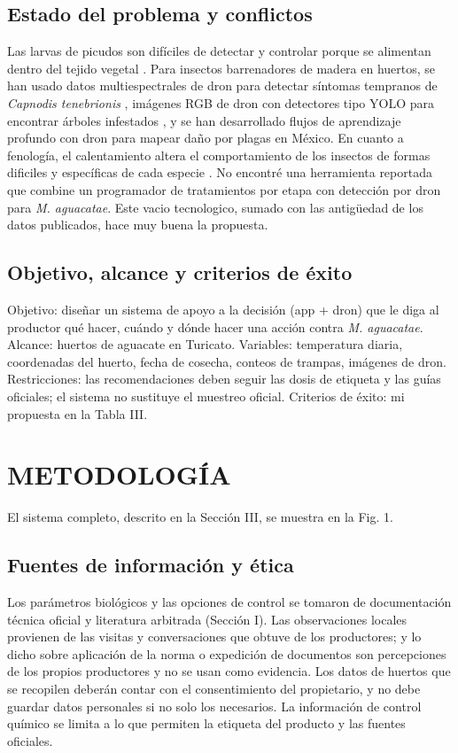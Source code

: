 \documentclass[conference]{IEEEtran}
\begin{document}
\subsection{Estado del problema y conflictos}
Las larvas de picudos son difíciles de detectar y controlar porque se alimentan dentro del tejido vegetal \cite{ref2}. Para insectos barrenadores de madera en huertos, se han usado datos multiespectrales de dron para detectar síntomas tempranos de \textit{Capnodis tenebrionis} \cite{ref15}, imágenes RGB de dron con detectores tipo YOLO para encontrar árboles infestados \cite{ref16}, y se han desarrollado flujos de aprendizaje profundo con dron para mapear daño por plagas en México\cite{ref17}. En cuanto a fenología, el calentamiento altera el comportamiento de los insectos de formas dificiles y específicas de cada especie \cite{ref18, ref19}. No encontré una herramienta reportada que combine un programador de tratamientos por etapa con detección por dron para \textit{M. aguacatae}. Este vacio tecnologico, sumado con las antigüedad de los datos publicados, hace muy buena la propuesta.

\subsection{Objetivo, alcance y criterios de éxito}
Objetivo: diseñar un sistema de apoyo a la decisión (app + dron) que le diga al productor qué hacer, cuándo y dónde hacer una acción contra \textit{M. aguacatae}. Alcance: huertos de aguacate en Turicato.
Variables: temperatura diaria, coordenadas del huerto, fecha de cosecha, conteos de trampas, imágenes de dron. 
Restricciones: las recomendaciones deben seguir las dosis de etiqueta y las guías oficiales; el sistema no sustituye el muestreo oficial. Criterios de éxito: mi propuesta en la Tabla III.

\section{METODOLOGÍA}
El sistema completo, descrito en la Sección III, se muestra en la Fig. 1.

\subsection{Fuentes de información y ética}
Los parámetros biológicos y las opciones de control se tomaron de documentación técnica oficial y literatura arbitrada (Sección I). Las observaciones locales provienen de las visitas y conversaciones que obtuve de los productores; y lo dicho sobre aplicación de la norma o expedición de documentos son percepciones de los propios productores y no se usan como evidencia. Los datos de huertos que se recopilen deberán contar con el consentimiento del propietario, y no debe guardar datos personales si no solo los necesarios. La información de control químico se limita a lo que permiten la etiqueta del producto y las fuentes oficiales.
\end{document}
